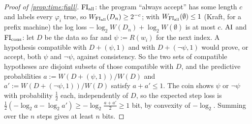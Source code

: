 \begin{proof}[Proof of \cref{prop:time:fiall}]
$\mathrm{FI}_{\mathrm{all}}$: the program ``always accept'' has some length $c$ and labels every $\varphi_i$ true, so $W_{\mathrm{FI}_{\mathrm{all}}}(D_n)\ge2^{-c}$; with $W_{\mathrm{FI}_{\mathrm{all}}}(\emptyset)\le1$ (Kraft, for a prefix machine) the log loss $-\log_2W(D_n)+\log_2W(\emptyset)$ is at most $c$.
$\mathrm{AI}$ and $\mathrm{FI}_{\mathrm{cons}}$: let $D$ be the data so far and $\psi:=R(w_{i})$ for the next index. A hypothesis compatible with $D+(\psi,1)$ and with $D+(\neg\psi,1)$ would prove, or accept, both $\psi$ and $\neg\psi$, against consistency. So the two sets of compatible hypotheses are disjoint subsets of those compatible with $D$, and the predictive probabilities $a:=W(D+(\psi,1))/W(D)$ and $a':=W(D+(\neg\psi,1))/W(D)$ satisfy $a+a'\le1$. The coin shows $\psi$ or $\neg\psi$ with probability $\tfrac12$ each, independently of $D$, so the expected step loss is $\tfrac12(-\log_2a-\log_2a')\ge-\log_2\frac{a+a'}2\ge1$ bit, by convexity of $-\log_2$. Summing over the $n$ steps gives at least $n$ bits.
\end{proof}

